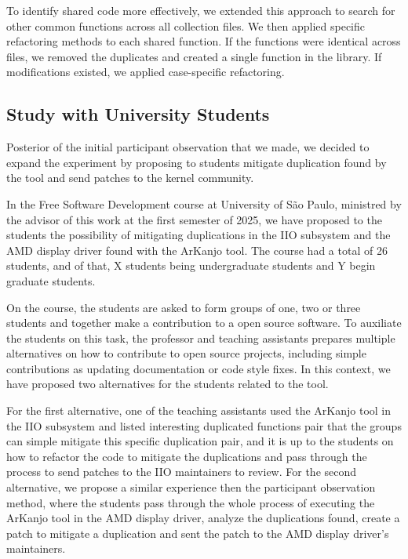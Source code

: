 To identify shared code more effectively, we extended this approach to search for other common 
functions across all collection files. We then applied specific refactoring methods to each shared 
function. If the functions were identical across files, we removed the duplicates and created a single 
function in the library. If modifications existed, we applied case-specific refactoring.

\subsection{Study with University Students}

Posterior of the initial participant observation that we made, we decided to expand the experiment 
by proposing to students mitigate duplication found by the tool and send patches to the kernel community.

In the Free Software Development course at University of São Paulo, ministred by the advisor 
of this work at the first semester of 2025, we have proposed to the students the possibility
of mitigating duplications in the IIO subsystem and the AMD display driver found with the ArKanjo tool.
The course had a total of 26 students, and of that, X students being undergraduate students
and Y begin graduate students.

On the course, the students are asked to form groups of one, two or three students and together 
make a contribution to a open source software. To auxiliate the students on this task, the 
professor and teaching assistants prepares multiple alternatives on how to contribute to open source projects, 
including simple contributions as updating documentation or code style fixes. In this context, 
we have proposed two alternatives for the students related to the tool.

For the first alternative, one of the teaching assistants used the ArKanjo tool in the IIO subsystem and
listed interesting duplicated functions pair that the groups can simple mitigate this specific duplication pair, 
and it is up to the students on how
to refactor the code to mitigate the duplications and pass through the process to send patches to the IIO 
maintainers to review. For the second alternative, we propose a similar experience then the 
participant observation method, where the students pass through the whole process of executing the ArKanjo tool
in the AMD display driver, analyze the duplications found, create a patch to mitigate a duplication and sent
the patch to the AMD display driver's maintainers.

